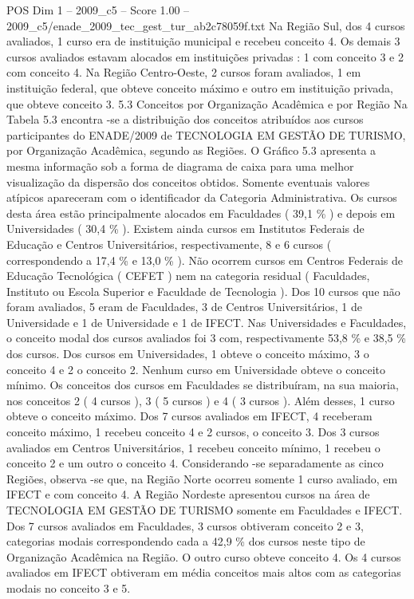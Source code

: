 \begin{textsample}{POS Dim 1 – 2009\_c5 – Score 1.00 – 2009\_c5/enade\_2009\_tec\_gest\_tur\_ab2c78059f.txt}
Na Região Sul, dos 4 cursos avaliados, 1 curso era de instituição municipal e recebeu conceito 4.
Os demais 3 cursos avaliados estavam alocados em instituições privadas : 1 com conceito 3 e 2 com conceito 4.
Na Região Centro-Oeste, 2 cursos foram avaliados, 1 em instituição federal, que obteve conceito máximo e outro em instituição privada, que obteve conceito 3. 5.3 Conceitos por Organização Acadêmica e por Região Na Tabela 5.3 encontra -se a distribuição dos conceitos atribuídos aos cursos participantes do ENADE/2009 de TECNOLOGIA EM GESTÃO DE TURISMO, por Organização Acadêmica, segundo as Regiões.
O Gráfico 5.3 apresenta a mesma informação sob a forma de diagrama de caixa para uma melhor visualização da dispersão dos conceitos obtidos.
Somente eventuais valores atípicos apareceram com o identificador da Categoria Administrativa.
Os cursos desta área estão principalmente alocados em Faculdades ( 39,1 \% ) e depois em Universidades ( 30,4 \% ).
Existem ainda cursos em Institutos Federais de Educação e Centros Universitários, respectivamente, 8 e 6 cursos ( correspondendo a 17,4 \% e 13,0 \% ).
Não ocorrem cursos em Centros Federais de Educação Tecnológica ( CEFET ) nem na categoria residual ( Faculdades, Instituto ou Escola Superior e Faculdade de Tecnologia ).
Dos 10 cursos que não foram avaliados, 5 eram de Faculdades, 3 de Centros Universitários, 1 de Universidade e 1 de Universidade e 1 de IFECT.
Nas Universidades e Faculdades, o conceito modal dos cursos avaliados foi 3 com, respectivamente 53,8 \% e 38,5 \% dos cursos.
Dos cursos em Universidades, 1 obteve o conceito máximo, 3 o conceito 4 e 2 o conceito 2.
Nenhum curso em Universidade obteve o conceito mínimo.
Os conceitos dos cursos em Faculdades se distribuíram, na sua maioria, nos conceitos 2 ( 4 cursos ), 3 ( 5 cursos ) e 4 ( 3 cursos ).
Além desses, 1 curso obteve o conceito máximo.
Dos 7 cursos avaliados em IFECT, 4 receberam conceito máximo, 1 recebeu conceito 4 e 2 cursos, o conceito 3.
Dos 3 cursos avaliados em Centros Universitários, 1 recebeu conceito mínimo, 1 recebeu o conceito 2 e um outro o conceito 4.
Considerando -se separadamente as cinco Regiões, observa -se que, na Região Norte ocorreu somente 1 curso avaliado, em IFECT e com conceito 4.
A Região Nordeste apresentou cursos na área de TECNOLOGIA EM GESTÃO DE TURISMO somente em Faculdades e IFECT.
Dos 7 cursos avaliados em Faculdades, 3 cursos obtiveram conceito 2 e 3, categorias modais correspondendo cada a 42,9 \% dos cursos neste tipo de Organização Acadêmica na Região.
O outro curso obteve conceito 4.
Os 4 cursos avaliados em IFECT obtiveram em média conceitos mais altos com as categorias modais no conceito 3 e 5.

\end{textsample}
